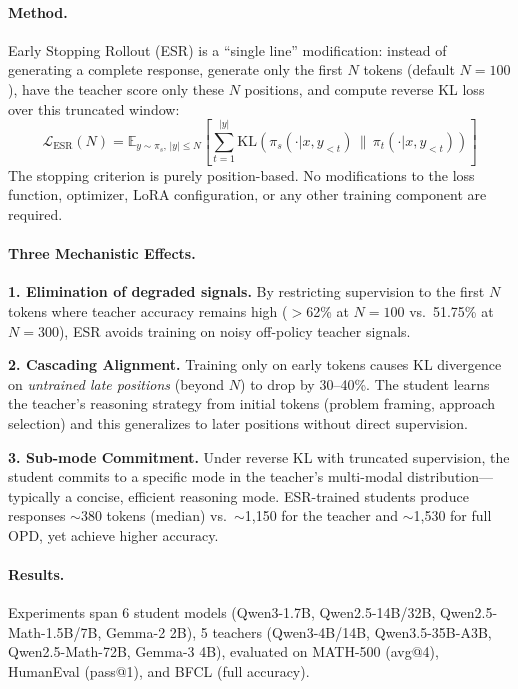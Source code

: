 \documentclass[11pt,a4paper]{article}
\begin{document}
\paragraph{Method.}
Early Stopping Rollout (ESR) is a ``single line'' modification: instead of generating a complete response, generate only the first $N$ tokens (default $N=100$), have the teacher score only these $N$ positions, and compute reverse KL loss over this truncated window:
\begin{equation}
    \mathcal{L}_{\mathrm{ESR}}(N) = \mathbb{E}_{y \sim \pi_s,\, |y| \leq N} \left[ \sum_{t=1}^{|y|} \mathrm{KL}\!\left(\pi_s(\cdot | x, y_{<t}) \,\|\, \pi_t(\cdot | x, y_{<t})\right) \right]
\end{equation}
The stopping criterion is purely position-based. No modifications to the loss function, optimizer, LoRA configuration, or any other training component are required.

\paragraph{Three Mechanistic Effects.}

\textbf{1. Elimination of degraded signals.} By restricting supervision to the first $N$ tokens where teacher accuracy remains high ($>$62\% at $N=100$ vs.\ 51.75\% at $N=300$), ESR avoids training on noisy off-policy teacher signals.

\textbf{2. Cascading Alignment.} Training only on early tokens causes KL divergence on \emph{untrained late positions} (beyond $N$) to drop by 30--40\%. The student learns the teacher's reasoning strategy from initial tokens (problem framing, approach selection) and this generalizes to later positions without direct supervision.

\textbf{3. Sub-mode Commitment.} Under reverse KL with truncated supervision, the student commits to a specific mode in the teacher's multi-modal distribution---typically a concise, efficient reasoning mode. ESR-trained students produce responses $\sim$380 tokens (median) vs.\ $\sim$1,150 for the teacher and $\sim$1,530 for full OPD, yet achieve higher accuracy.

\paragraph{Results.}
Experiments span 6 student models (Qwen3-1.7B, Qwen2.5-14B/32B, Qwen2.5-Math-1.5B/7B, Gemma-2 2B), 5 teachers (Qwen3-4B/14B, Qwen3.5-35B-A3B, Qwen2.5-Math-72B, Gemma-3 4B), evaluated on MATH-500 (avg@4), HumanEval (pass@1), and BFCL (full accuracy).
\end{document}
